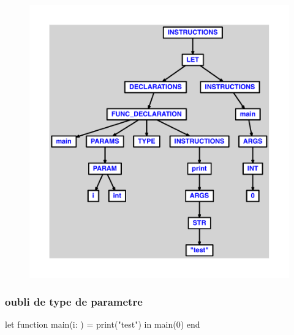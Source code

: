 \documentclass{article}
\begin{document}
\begin{figure}[H]\centering\includegraphics[max width=\textwidth]{ast/ast_209.pdf}\end{figure}\subsubsection{oubli de type de parametre}
\begin{verbatimtab}
let
	function main(i: ) = print("test")
in main(0) end
\end{verbatimtab}
\end{document}
